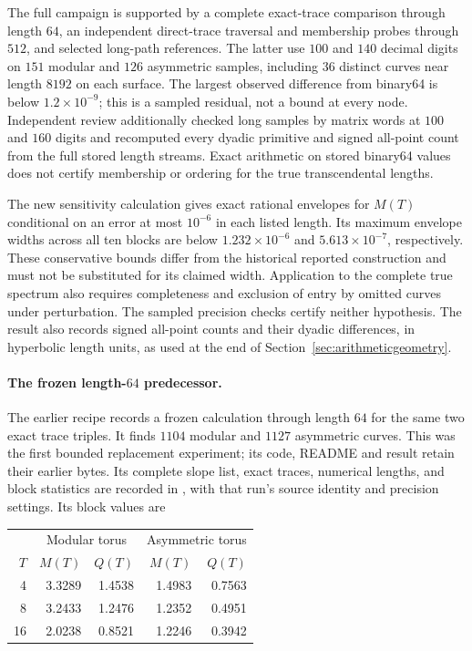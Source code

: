 The full campaign is supported by a complete exact-trace comparison
through length $64$, an independent direct-trace traversal and membership
probes through $512$, and selected long-path references. The latter use
$100$ and $140$ decimal digits on $151$ modular and $126$ asymmetric
samples, including $36$ distinct curves near length $8192$ on each
surface. The largest observed difference from binary64 is below
$1.2\times10^{-9}$; this is a sampled residual, not a bound at every
node. Independent review additionally checked long samples by matrix
words at $100$ and $160$ digits and recomputed every dyadic primitive
and signed all-point count from the full stored length streams.
Exact arithmetic on stored binary64 values does not certify membership
or ordering for the true transcendental lengths.

The new sensitivity calculation gives exact rational envelopes for
$M(T)$ conditional on an error at most $10^{-6}$ in each listed length.
Its maximum envelope widths across all ten blocks are below
$1.232\times10^{-6}$ and $5.613\times10^{-7}$, respectively.
These conservative bounds differ from the historical reported
construction and must not be substituted for its claimed width.
Application to the complete true spectrum also requires completeness
and exclusion of entry by omitted curves under perturbation. The
sampled precision checks certify neither hypothesis. The result also
records signed all-point counts and their dyadic differences, in
hyperbolic length units, as used at the end of
Section~\ref{sec:arithmeticgeometry}.

\paragraph{The frozen length-$64$ predecessor.}
The earlier recipe  records a frozen
calculation through length $64$ for the same two exact trace triples.
It finds $1104$ modular and $1127$ asymmetric curves. This was the first bounded replacement
experiment; its code, README and result retain their earlier bytes.
Its complete slope list, exact traces, numerical lengths, and block
statistics are recorded in , with
that run's source identity and precision settings. Its block values are
\begin{center}
\begin{tabular}{r r r r r}
\toprule
&\multicolumn{2}{c}{Modular torus}&\multicolumn{2}{c}{Asymmetric torus}\\
$T$&$M(T)$&$Q(T)$&$M(T)$&$Q(T)$\\
\midrule
4 & 3.3289 & 1.4538 & 1.4983 & 0.7563 \\
8 & 3.2433 & 1.2476 & 1.2352 & 0.4951 \\
16 & 2.0238 & 0.8521 & 1.2246 & 0.3942 \\
\bottomrule
\end{tabular}
\end{center}

